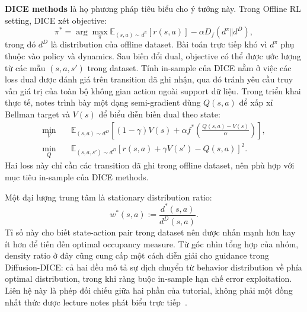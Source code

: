 \textbf{DICE methods} là họ phương pháp tiêu biểu cho ý tưởng này.
Trong Offline RL setting, DICE xét objective:
\begin{equation}
    \pi^*
    =
    \arg\max_\pi
    \mathbb{E}_{(s,a)\sim d^\pi}
    [r(s,a)]
    -
    \alpha
    D_f(d^\pi\Vert d^D),
    \label{eq:tv2-dice-objective}
\end{equation}
trong đó $d^D$ là distribution của offline dataset.
Bài toán trực tiếp khó vì $d^\pi$ phụ thuộc vào policy và dynamics.
Sau biến đổi dual, objective có thể được ước lượng từ các mẫu $(s,a,s')$ trong dataset.
Tính in-sample của DICE nằm ở việc các loss dual được đánh giá trên transition đã ghi nhận, qua đó tránh yêu cầu truy vấn giá trị của toàn bộ không gian action ngoài support dữ liệu.
Trong triển khai thực tế, notes trình bày một dạng semi-gradient dùng $Q(s,a)$ để xấp xỉ Bellman target và $V(s)$ để biểu diễn biến dual theo state:
\begin{equation}
\begin{aligned}
    \min_V\quad
    &
    \mathbb{E}_{(s,a)\sim d^D}
    \left[
        (1-\gamma)V(s)
        +
        \alpha f^*
        \left(
            \frac{Q(s,a)-V(s)}{\alpha}
        \right)
    \right],\\
    \min_Q\quad
    &
    \mathbb{E}_{(s,a,s')\sim d^D}
    \left[
        r(s,a)
        +
        \gamma V(s')
        -
        Q(s,a)
    \right]^2 .
\end{aligned}
    \label{eq:tv2-dice-semi-gradient}
\end{equation}
Hai loss này chỉ cần các transition đã ghi trong offline dataset, nên phù hợp với mục tiêu in-sample của DICE methods.

Một đại lượng trung tâm là stationary distribution ratio:
\begin{equation}
    w^*(s,a)
    :=
    \frac{d^*(s,a)}{d^D(s,a)}.
    \label{eq:tv2-density-ratio}
\end{equation}
Tỉ số này cho biết state-action pair trong dataset nên được nhấn mạnh hơn hay ít hơn để tiến đến optimal occupancy measure.
Từ góc nhìn tổng hợp của nhóm, density ratio ở đây cũng cung cấp một cách diễn giải cho guidance trong Diffusion-DICE: cả hai đều mô tả sự dịch chuyển từ behavior distribution về phía optimal distribution, trong khi ràng buộc in-sample hạn chế error exploitation.
Liên hệ này là phép đối chiếu giữa hai phần của tutorial, không phải một đồng nhất thức được lecture notes phát biểu trực tiếp~\cite{eysenbach2025generativerl,mao2024diffusiondice}.

